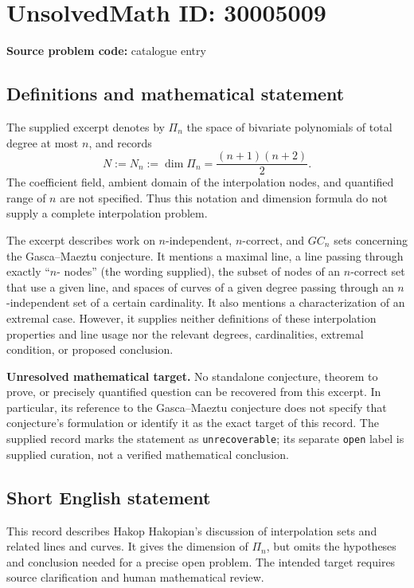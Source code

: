 \documentclass[11pt]{article}
\begin{document}
\section*{UnsolvedMath ID: 30005009}
\textbf{Source problem code:} catalogue entry
\subsection{Definitions and mathematical statement}
The supplied excerpt denotes by \(\Pi_n\) the space of bivariate polynomials of total degree at most \(n\), and records
\[
N:=N_n:=\dim\Pi_n=\frac{(n+1)(n+2)}{2}.
\]
The coefficient field, ambient domain of the interpolation nodes, and quantified range of \(n\) are not specified. Thus this notation and dimension formula do not supply a complete interpolation problem.

The excerpt describes work on \(n\)-independent, \(n\)-correct, and \(GC_n\) sets concerning the Gasca--Maeztu conjecture. It mentions a maximal line, a line passing through exactly ``\(n\)- nodes'' (the wording supplied), the subset of nodes of an \(n\)-correct set that use a given line, and spaces of curves of a given degree passing through an \(n\)-independent set of a certain cardinality. It also mentions a characterization of an extremal case. However, it supplies neither definitions of these interpolation properties and line usage nor the relevant degrees, cardinalities, extremal condition, or proposed conclusion.

\textbf{Unresolved mathematical target.} No standalone conjecture, theorem to prove, or precisely quantified question can be recovered from this excerpt. In particular, its reference to the Gasca--Maeztu conjecture does not specify that conjecture's formulation or identify it as the exact target of this record. The supplied record marks the statement as \texttt{unrecoverable}; its separate \texttt{open} label is supplied curation, not a verified mathematical conclusion.
\subsection{Short English statement}
This record describes Hakop Hakopian's discussion of interpolation sets and related lines and curves. It gives the dimension of \(\Pi_n\), but omits the hypotheses and conclusion needed for a precise open problem. The intended target requires source clarification and human mathematical review.
\end{document}
